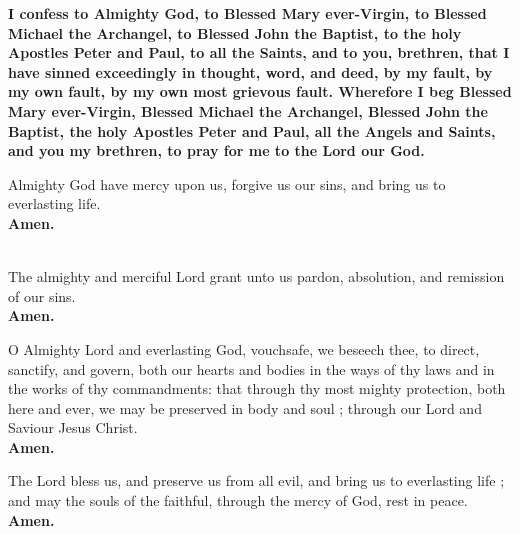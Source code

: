 \textbf{I confess to Almighty God, to Blessed Mary ever-Virgin, to Blessed Michael
the Archangel, to Blessed John the Baptist, to the holy Apostles Peter and
Paul, to all the Saints, and to you, brethren, that I have sinned exceedingly in
thought, word, and deed, by my fault, by my own fault, by my own most
grievous fault. Wherefore I beg Blessed Mary ever-Virgin, Blessed Michael
the Archangel, Blessed John the Baptist, the holy Apostles Peter and Paul, all
the Angels and Saints, and you my brethren, to pray for me to the Lord our
God.}

Almighty God have mercy upon us, forgive us our sins, and bring us to everlasting life.\\
\textbf{Amen.}

\\
The almighty and merciful Lord grant unto us pardon, absolution, and remission of our sins.\\
\textbf{Amen.}


O Almighty Lord and everlasting God, vouchsafe, we beseech thee, to direct,
sanctify, and govern, both our hearts and bodies in the ways of thy laws and in
the works of thy commandments: that through thy most mighty protection, both here and ever,
we may be preserved in body and soul ; through our Lord and Saviour Jesus Christ.\\
\textbf{Amen.}


The Lord bless us, and preserve us from all evil, and bring us to everlasting life ;
and may the souls of the faithful, through the mercy of God, rest in peace.\\
\textbf{Amen.}


\clearpage
